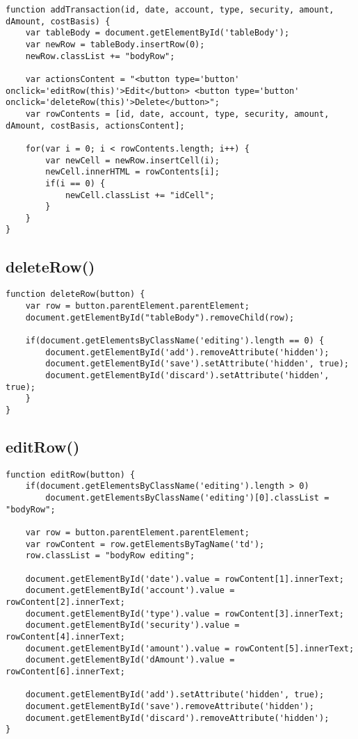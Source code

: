\documentclass[letterpaper]{article}
\begin{document}
\begin{lstlisting}[firstnumber=139]
function addTransaction(id, date, account, type, security, amount, dAmount, costBasis) {
    var tableBody = document.getElementById('tableBody');
    var newRow = tableBody.insertRow(0);
    newRow.classList += "bodyRow";

    var actionsContent = "<button type='button' onclick='editRow(this)'>Edit</button> <button type='button' onclick='deleteRow(this)'>Delete</button>";
    var rowContents = [id, date, account, type, security, amount, dAmount, costBasis, actionsContent];

    for(var i = 0; i < rowContents.length; i++) {
        var newCell = newRow.insertCell(i);
        newCell.innerHTML = rowContents[i];
        if(i == 0) {
            newCell.classList += "idCell";
        }
    }
}
\end{lstlisting}

\subsection{deleteRow()}

\begin{lstlisting}[firstnumber=173]
function deleteRow(button) {
    var row = button.parentElement.parentElement;
    document.getElementById("tableBody").removeChild(row);

    if(document.getElementsByClassName('editing').length == 0) {
        document.getElementById('add').removeAttribute('hidden');
        document.getElementById('save').setAttribute('hidden', true);
        document.getElementById('discard').setAttribute('hidden', true);
    }
}
\end{lstlisting}

\subsection{editRow()}

\begin{lstlisting}[firstnumber=184]
function editRow(button) {
    if(document.getElementsByClassName('editing').length > 0)
        document.getElementsByClassName('editing')[0].classList = "bodyRow";

    var row = button.parentElement.parentElement;
    var rowContent = row.getElementsByTagName('td');
    row.classList = "bodyRow editing";

    document.getElementById('date').value = rowContent[1].innerText;
    document.getElementById('account').value = rowContent[2].innerText;
    document.getElementById('type').value = rowContent[3].innerText;
    document.getElementById('security').value = rowContent[4].innerText;
    document.getElementById('amount').value = rowContent[5].innerText;
    document.getElementById('dAmount').value = rowContent[6].innerText;

    document.getElementById('add').setAttribute('hidden', true);
    document.getElementById('save').removeAttribute('hidden');
    document.getElementById('discard').removeAttribute('hidden');
}
\end{lstlisting}
\end{document}
